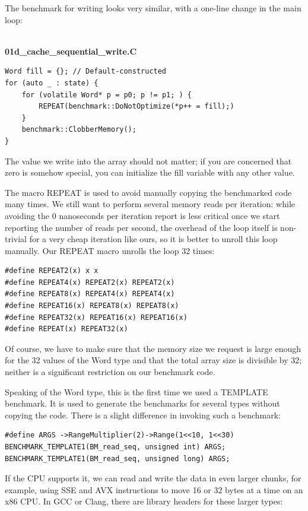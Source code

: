 The benchmark for writing looks very similar, with a one-line change in the main loop:

\hspace*{\fill} \\ %
\noindent
\textbf{01d\_cache\_sequential\_write.C}
\begin{lstlisting}[style=styleCXX]
Word fill = {}; // Default-constructed
for (auto _ : state) {
	for (volatile Word* p = p0; p != p1; ) {
		REPEAT(benchmark::DoNotOptimize(*p++ = fill);)
	}
	benchmark::ClobberMemory();
}
\end{lstlisting}

The value we write into the array should not matter; if you are concerned that zero is somehow special, you can initialize the fill variable with any other value.

The macro REPEAT is used to avoid manually copying the benchmarked code many times. We still want to perform several memory reads per iteration: while avoiding the 0 nanoseconds per iteration report is less critical once we start reporting the number of reads per second, the overhead of the loop itself is non-trivial for a very cheap iteration like ours, so it is better to unroll this loop manually. Our REPEAT macro unrolls the loop 32 times:

\begin{lstlisting}[style=styleCXX]
#define REPEAT2(x) x x
#define REPEAT4(x) REPEAT2(x) REPEAT2(x)
#define REPEAT8(x) REPEAT4(x) REPEAT4(x)
#define REPEAT16(x) REPEAT8(x) REPEAT8(x)
#define REPEAT32(x) REPEAT16(x) REPEAT16(x)
#define REPEAT(x) REPEAT32(x)
\end{lstlisting}

Of course, we have to make sure that the memory size we request is large enough for the 32 values of the Word type and that the total array size is divisible by 32; neither is a significant restriction on our benchmark code.

Speaking of the Word type, this is the first time we used a TEMPLATE benchmark. It is used to generate the benchmarks for several types without copying the code. There is a slight difference in invoking such a benchmark:

\begin{lstlisting}[style=styleCXX]
#define ARGS ->RangeMultiplier(2)->Range(1<<10, 1<<30)
BENCHMARK_TEMPLATE1(BM_read_seq, unsigned int) ARGS;
BENCHMARK_TEMPLATE1(BM_read_seq, unsigned long) ARGS;
\end{lstlisting}

If the CPU supports it, we can read and write the data in even larger chunks, for example, using SSE and AVX instructions to move 16 or 32 bytes at a time on an x86 CPU. In GCC or Clang, there are library headers for these larger types:

